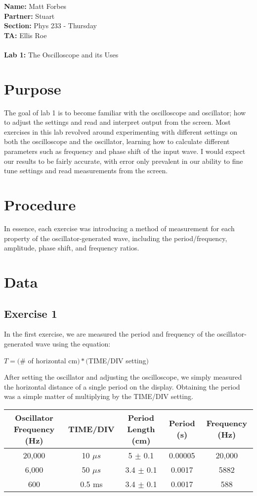 \documentclass[a4paper,12pt]{article}
\begin{document}
{\bf Name:} Matt Forbes \\
{\bf Partner:} Stuart  \\ 
{\bf Section:} Phys 233 - Thursday \\
{\bf TA:} Ellis Roe  \\ \\ 
{\bf Lab 1:} The Oscilloscope and its Uses \\

\section{Purpose}
The goal of lab 1 is to become familiar with the oscilloscope and
oscillator; how to adjust the settings and read and interpret output
from the screen. Most exercises in this lab revolved around
experimenting with different settings on both the oscilloscope and the
oscillator, learning how to calculate different parameters such as
frequency and phase shift of the input wave. I would expect our
results to be fairly accurate, with error only prevalent in our
ability to fine tune settings and read measurements from the screen.

\section{Procedure}
In essence, each exercise was introducing a method of measurement for
each property of the oscillator-generated wave, including the
period/frequency, amplitude, phase shift, and frequency ratios. 

\section{Data}
\subsection{Exercise 1}
In the first exercise, we are measured the period and frequency of the
oscillator-generated wave using the equation:
\begin{center}
  $T = ($\# of horizontal cm$) * ($TIME/DIV setting$)$
\end{center}

After setting the oscillator and adjusting the oscilloscope, we simply
measured the horizontal distance of a single period on the
display. Obtaining the period was a simple matter of multiplying by
the TIME/DIV setting. \\ 

\begin{tabular}{|c|c|c|c|c|}
  \hline
  Oscillator Frequency (Hz) & TIME/DIV & Period Length (cm) & Period (s) & Frequency (Hz) \\
  \hline
  20,000 & 10 $\mu s$ & 5 $\pm$ 0.1 & 0.00005 & 20,000 \\
  6,000 & 50 $\mu s$ & 3.4 $\pm$ 0.1 & 0.0017 & 5882 \\
  600 & 0.5 ms & 3.4 $\pm$ 0.1 & 0.0017 & 588 \\
  \hline
\end{tabular}
\end{document}
